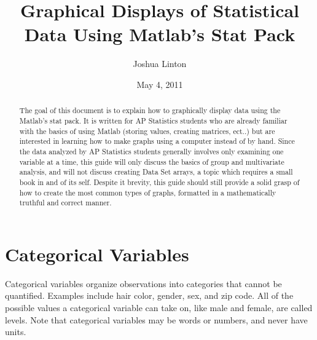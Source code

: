 \documentclass[10pt]{article}
\begin{document}
\title{Graphical Displays of Statistical Data Using Matlab's Stat Pack}
\author{Joshua Linton}
\date{May 4, 2011}
\maketitle
\vspace*{\fill}
\begin{abstract}
The goal of this document is to explain how to graphically display data using the Matlab's stat pack.  It is written for AP Statistics students who are already familiar with the basics of using Matlab (storing values, creating matrices, ect..) but are interested in learning how to make graphs using a computer instead of by hand. Since the data analyzed by AP Statistics students generally involves only examining one variable at a time, this guide will only discuss the basics of group and multivariate analysis, and will not discuss creating Data Set arrays, a topic which requires a small book in and of its self. Despite it brevity, this guide should still provide a solid grasp of how to create the most common types of graphs, formatted in a mathematically truthful and correct manner.
\end{abstract}
\vspace*{\fill}
\pagebreak
\section{Categorical Variables}
Categorical variables organize observations into categories that cannot be quantified. Examples include hair color, gender, sex, and zip code. All of the possible values a categorical variable can take on, like male and female, are called levels. Note that categorical variables may be words or numbers, and never have units. 
\end{document}
